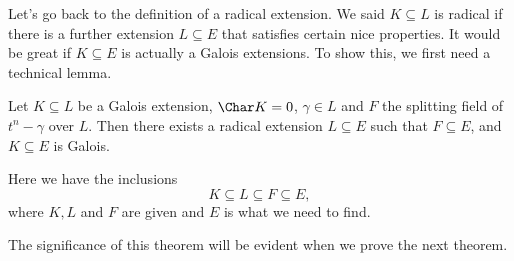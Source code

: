 \documentclass[a4paper]{article}
\begin{document}
Let's go back to the definition of a radical extension. We said $K\subseteq L$ is radical if there is a further extension $L\subseteq E$ that satisfies certain nice properties. It would be great if $K\subseteq E$ is actually a Galois extensions. To show this, we first need a technical lemma.
\begin{lemma}
  Let $K\subseteq L$ be a Galois extension, $\Char K = 0$, $\gamma \in L$ and $F$ the splitting field of $t^n - \gamma$ over $L$. Then there exists a radical extension $L\subseteq E$ such that $F\subseteq E$, and $K\subseteq E$ is Galois.
\end{lemma}
Here we have the inclusions
\[
  K\subseteq L \subseteq F \subseteq E,
\]
where $K, L$ and $F$ are given and $E$ is what we need to find.

The significance of this theorem will be evident when we prove the next theorem.
\end{document}
